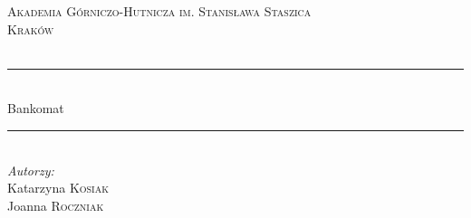\documentclass[a4paper, 11pt]{article}
\begin{document}
	
	\begin{titlepage}
		
		
		
		\newcommand{\HRule}{\rule{\linewidth}{0.5mm}} %
		
		\center %
		
		
		\textsc{\LARGE Akademia Górniczo-Hutnicza im. Stanisława Staszica}\\[1.5cm] %
		\textsc{\Large Kraków}\\[0.5cm] %
		\textsc{\large }\\[0.5cm] %
		
		
		\HRule \\[0.4cm]
		{\fontsize{38}{50}\selectfont Bankomat}
		\HRule \\[1.5cm]
		
		
		\Large \emph{Autorzy:}\\
		Katarzyna \textsc{Kosiak} \\
		Joanna \textsc{Roczniak}\\[3cm]\ %
		

\end{titlepage}
\end{document}
